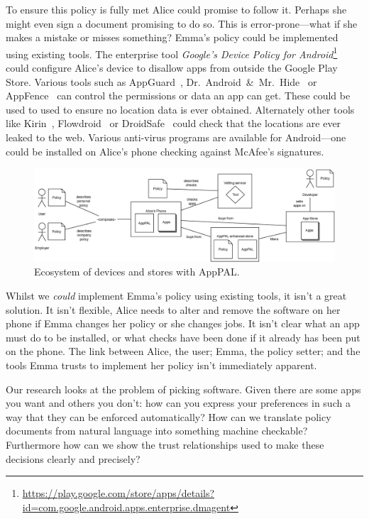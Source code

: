 \documentclass[a4paper]{scrartcl}
\begin{document}
To ensure this policy is fully met Alice could promise to follow it.
Perhaps she might even sign a document promising to do so.
This is error-prone---what if she makes a mistake or misses something?
Emma's policy could be implemented using existing tools.
The enterprise tool \emph{Google's Device Policy for Android}\footnote{\url{https://play.google.com/store/apps/details?id=com.google.android.apps.enterprise.dmagent}}
  could configure Alice's device to disallow apps from outside the Google Play Store.
Various tools such as AppGuard~\citep{Backes:2012vm}, Dr.~Android~\&~Mr.~Hide~\citep{Jeon:2012ki} or AppFence~\citep{Hornyack:2011wq} can control the permissions or data an app can get.
These could be used to used to ensure no location data is ever obtained.
Alternately other tools like Kirin~\citep{Enck:2009ko}, Flowdroid~\citep{Fritz:2013vi} or DroidSafe~\citep{Gordon:2015et} could check that the locations are ever leaked to the web.
Various anti-virus programs are available for Android---one could be installed on Alice's phone checking against McAfee's signatures.

\begin{figure}
\includegraphics{figures/overview.eps}
\caption{Ecosystem of devices and stores with AppPAL.}
\label{fig:ecosystem}
\end{figure}

Whilst we \emph{could} implement Emma's policy using existing tools, it isn't a great solution.
It isn't flexible, Alice needs to alter and remove the software on her phone if Emma changes her policy or she changes jobs.
It isn't clear what an app must do to be installed, or what checks have been done if it already has been put on the phone.
The link between Alice, the user; Emma, the policy setter; and the tools Emma trusts to implement her policy isn't immediately apparent.


Our research looks at the problem of picking software.
Given there are some apps you want and others you don't:
  how can you express your preferences in such a way that they can be enforced automatically?
How can we translate policy documents from natural language into something machine checkable?
Furthermore how can we show the trust relationships used to make these decisions clearly and precisely?
\end{document}
